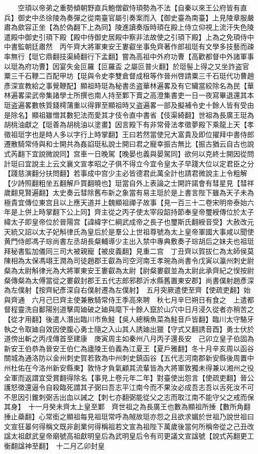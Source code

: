 　　空頊以帝弟之重勢傾朝野直兵鮑僧叡恃頊勢為不法【自秦以來王公府皆有直兵】御史中丞徐陵為奏彈之從南臺官屬引奏案而入【御史臺為南臺】上見陵章服嚴肅為歛容正坐【為於偽翻下上為同】陵進讀奏版時頊在殿上侍立仰視上流汗失色陵遣殿中御史引頊下殿【殿中侍御史居殿中察非法故使之引頊下殿】上為之免頊侍中中書監朝廷肅然　丙午齊大將軍東安王婁叡坐事免齊著作郎祖珽有文學多技藝而疎率無行【珽它鼎翻技渠綺翻行下孟翻】嘗為高祖中外府功曹【高歡都督中外諸軍事以珽為府功曹】因宴失金叵羅【叵羅盃之屬叵普火翻】於珽髻上得之又坐詐盗官粟三千石鞭二百配甲坊【珽與令史李雙倉督成租等作晉州啓請粟三千石珽代功曹趙彥深宣教給之事覺鞭配】顯祖時珽為秘書丞盗華林遍畧及有它贜當絞除名為民【華林遍畧梁武帝集諸學士所撰也南人持至鄴下賣之高澄集書吏一日一夜寫畢退還其本珽盗遍畧數帙質錢樗蒲重以得罪至顯祖時又盗遍畧一部及擬補令史十餘人皆有受由是除名】顯祖雖憎其數犯法而愛其才伎令直中書省【伎渠綺翻】世祖為長廣王珽為胡桃油獻之【珽善為胡桃油以塗畫】因言殿下有非常骨法孝徵夢殿下乘龍上天【孝徵祖珽字也是時人多以字行上時掌翻】王曰若然當使兄大富貴及即位擢拜中書侍郎遷散騎常侍與和士開共為姦諂珽私說士開曰君之寵幸振古無比【振古猶云自古也說式芮翻下宜說微說同】宫車一日晚駕【晚晏也義與晏駕同】欲何以克終士開因從問計珽曰宜說主上云文襄文宣孝昭之子俱不得立今宜令皇太子早踐大位以定君臣之分【踐慈演翻分扶問翻】若事成中宫少主必皆德君此萬全計也請君微說主上令粗解【少詩照翻粗坐五翻解戶買翻曉也】珽當自外上表論之士開許諾會有彗星見【彗祥歲翻見賢遍翻】太史奏云彗除舊布新之象當有易主珽於是上書言陛下雖為天子未為極貴宜傳位東宫且以上應天道并上魏顯祖禪子故事【見一百三十二卷宋明帝泰始六年是上併上時掌翻下公上同】齊主從之丙子使太宰段韶持節奉皇帝璽綬傳位於太子緯太子即皇帝位於晉陽宫【諱緯字仁綱武成帝之長子也璽斯氏翻綬音受】大赦改元天統又詔以太子妃斛律氏為皇后於是羣公上世祖尊號為太上皇帝軍國大事咸以聞使黄門侍郎馮子琮尚書左丞胡長粲輔導少主出入禁中專典敷奏子琮胡后之妹夫也祖珽拜秘書監加儀同三司大被親寵【被皮義翻】見重二宫　丁丑齊以賀拔仁為太師侯莫陳相為太保馮翊王潤為司徒趙郡王叡為司空河南王孝琬為尚書令戊寅以瀛州刺史尉粲為太尉斛律光為大將軍東安王婁叡為太尉【尉粲婁叡並為太尉此承齊紀之悮按尉粲傳粲為太傅當從之婁叡封郡王五代志郎邪郡沂水縣舊置東安郡】尚書僕射趙彥深為左僕射【按齊紀彥深自右僕射遷為左僕射】　五月突厥遣使至齊【使疏吏翻】始與齊通　六月己巳齊主使兼散騎常侍王季高來聘　秋七月辛巳朔日有食之　上遣都督程靈洗自鄱陽别道擊周廸破之廸與麾下十餘人竄於山穴中日月浸久從者亦稍苦之【從才用翻】後遣人潛出臨川市魚鮭【吳人總稱魚菜為鮭音戶皆翻】臨川太守駱牙執之令取廸自效因使腹心勇士隨之入山其人誘廸出獵【守式又翻誘音酉】勇士伏於道傍出斬之丙戌傳首至建康　庚寅周主如秦州八月丙子還長安　己卯立皇子伯固為新安王伯恭為晉安王伯仁為廬陵王伯義為江夏王【夏戶雅翻】冬十月辛亥周以函谷關城為通洛防以金州刺史賀若敦為中州刺史鎮函谷【五代志河南郡新安縣後周置中州杜佑在今洛州新安縣東】敦恃才負氣顧其流輩皆為大將軍敦獨未得兼以湘州之役全軍而返謂宜受賞翻得除名【事見上卷元年二年】對臺使出怨言【使疏吏翻】晉公護怒徵還逼令自殺臨死謂其子弼曰吾志平江南今而不果汝必成吾志吾以舌死汝不可不思因引錐刺弼舌出血以誡之【刺七亦翻弼能從父之志而取江南不能守父之戒而保其身】　十一月癸未齊太上皇至鄴　齊世祖之為長廣王也數為顯祖所捶【數所角翻捶止蘃翻】心常銜之顯祖每見祖珽常呼為賊故珽亦怨之且欲求媚於世祖乃說世祖曰文宣狂㬥何得稱文既非創業何得稱祖若文宣為祖陛下萬歲後當何所稱帝從之己丑改諡太祖獻武皇帝廟號高祖獻明皇后為武明皇后令有司更議文宣諡號【說式芮翻更工衡翻諡神至翻】　十二月乙卯封皇